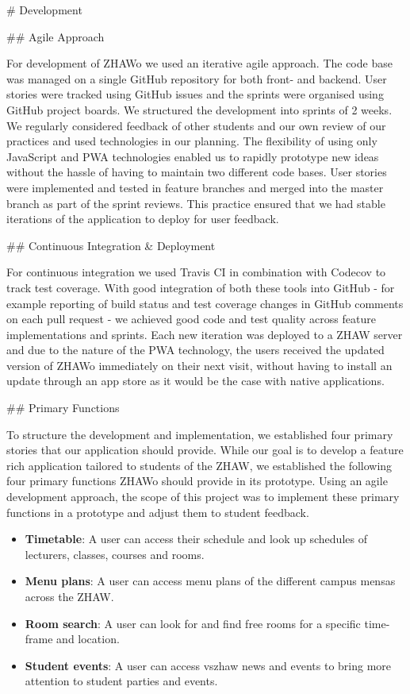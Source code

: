 \begin{markdown}

# Development

## Agile Approach

For development of ZHAWo we used an iterative agile approach. The code base was managed on a single GitHub repository \cite{OurGithub} for both front- and backend. User stories were tracked using GitHub issues and the sprints were organised using GitHub project boards. We structured the development into sprints of 2 weeks. We regularly considered feedback of other students and our own review of our practices and used technologies in our planning. The flexibility of using only JavaScript and PWA technologies enabled us to rapidly prototype new ideas without the hassle of having to maintain two different code bases.
User stories were implemented and tested in feature branches and merged into the master branch as part of the sprint reviews. This practice ensured that we had stable iterations of the application to deploy for user feedback.

## Continuous Integration \& Deployment

For continuous integration we used Travis CI \cite{Travis} in combination with Codecov \cite{Codecov} to track test coverage. With good integration of both these tools into GitHub - for example reporting of build status and test coverage changes in GitHub comments on each pull request - we achieved good code and test quality across feature implementations and sprints.
Each new iteration was deployed to a ZHAW server and due to the nature of the PWA technology, the users received the updated version of ZHAWo immediately on their next visit, without having to install an update through an app store as it would be the case with native applications.

## Primary Functions

To structure the development and implementation, we established four primary stories that our application should provide.
While our goal is to develop a feature rich application tailored to students of the ZHAW, we established the following four primary functions ZHAWo should provide in its prototype. Using an agile development approach, the scope of this project was to implement these primary functions in a prototype and adjust them to student feedback.

\begin{itemize}
  \item \textbf{Timetable}: A user can access their schedule and look up schedules of lecturers, classes, courses and rooms.
  \item \textbf{Menu plans}: A user can access menu plans of the different campus mensas across the ZHAW.
  \item \textbf{Room search}: A user can look for and find free rooms for a specific time-frame and location.
  \item \textbf{Student events}: A user can access vszhaw news and events to bring more attention to student parties and events.
\end{itemize}


\end{markdown}
